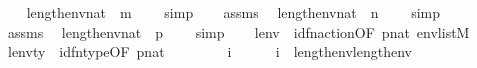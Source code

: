 \begin{isabellebody}
\ \ \isamarkupfalse%
\ {\isachardoublequoteopen}length{\isacharparenleft}{\kern0pt}env{\isacharparenright}{\kern0pt}{\isasymin}nat{\isachardoublequoteclose}\ {\isacharparenleft}{\kern0pt}\ {\isachardoublequoteopen}{\isacharquery}{\kern0pt}m\ {\isasymin}\ {\isacharunderscore}{\kern0pt}{\isachardoublequoteclose}{\isacharparenright}{\kern0pt}\ \isamarkupfalse%
\ simp\isanewline
\ \ \isamarkupfalse%
\ assms\ \isamarkupfalse%
\ {\isachardoublequoteopen}length{\isacharparenleft}{\kern0pt}env{\isacharprime}{\kern0pt}{\isacharparenright}{\kern0pt}{\isasymin}nat{\isachardoublequoteclose}\ {\isacharparenleft}{\kern0pt}\ {\isachardoublequoteopen}{\isacharquery}{\kern0pt}n\ {\isasymin}\ {\isacharunderscore}{\kern0pt}{\isachardoublequoteclose}{\isacharparenright}{\kern0pt}\ \isamarkupfalse%
\ simp\isanewline
\ \ \isamarkupfalse%
\ assms\ \isamarkupfalse%
\ {\isachardoublequoteopen}length{\isacharparenleft}{\kern0pt}env{}{\isacharparenright}{\kern0pt}{\isasymin}nat{\isachardoublequoteclose}\ {\isacharparenleft}{\kern0pt}\ {\isachardoublequoteopen}{\isacharquery}{\kern0pt}p\ {\isasymin}\ {\isacharunderscore}{\kern0pt}{\isachardoublequoteclose}{\isacharparenright}{\kern0pt}\ \isamarkupfalse%
\ simp\isanewline
\ \ \isamarkupfalse%
\ lenv\ {\isacharequal}{\kern0pt}\ id{\isacharunderscore}{\kern0pt}fn{\isacharunderscore}{\kern0pt}action{\isacharbrackleft}{\kern0pt}OF\ {\isacartoucheopen}{\isacharquery}{\kern0pt}p{\isasymin}nat{\isacartoucheclose}\ {\isacartoucheopen}env{}{\isasymin}list{\isacharparenleft}{\kern0pt}M{\isacharparenright}{\kern0pt}{\isacartoucheclose}{\isacharbrackright}{\kern0pt}\isanewline
\ \ \isamarkupfalse%
\ lenv{\isacharunderscore}{\kern0pt}ty\ {\isacharequal}{\kern0pt}\ id{\isacharunderscore}{\kern0pt}fn{\isacharunderscore}{\kern0pt}type{\isacharbrackleft}{\kern0pt}OF\ {\isacartoucheopen}{\isacharquery}{\kern0pt}p{\isasymin}nat{\isacartoucheclose}{\isacharbrackright}{\kern0pt}\isanewline
\ \ \isacommand{{\isacharbraceleft}{\kern0pt}}\isamarkupfalse%
\isanewline
\ \ \ \ \isamarkupfalse%
\ i\isanewline
\ \ \ \ \isamarkupfalse%
\ {\isachardoublequoteopen}i\ {\isacharless}{\kern0pt}\ length{\isacharparenleft}{\kern0pt}env{\isacharparenright}{\kern0pt}{\isacharhash}{\kern0pt}{\isacharplus}{\kern0pt}length{\isacharparenleft}{\kern0pt}env{}{\isacharparenright}{\kern0pt}{\isachardoublequoteclose}\isanewline

\end{isabellebody}

